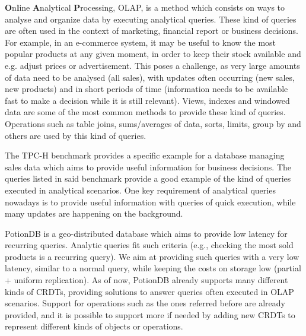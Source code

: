 \textbf{O}n\textbf{l}ine \textbf{A}nalytical \textbf{P}rocessing, OLAP, is a method which consists on ways to analyse and organize data by executing analytical queries.
These kind of queries are often used in the context of marketing, financial report or business decisions.
For example, in an e-commerce system, it may be useful to know the most popular products at any given moment, in order to keep their stock available and e.g. adjust prices or advertisement.
This poses a challenge, as very large amounts of data need to be analysed (all sales), with updates often occurring (new sales, new products) and in short periods of time (information needs to be available fast to make a decision while it is still relevant).
Views, indexes and windowed data are some of the most common methods to provide these kind of queries.
Operations such as table joins, sums/averages of data, sorts, limits, group by and others are used by this kind of queries.

The TPC-H benchmark provides a specific example for a database managing sales data which aims to provide useful information for business decisions.
The queries listed in said benchmark provide a good example of the kind of queries executed in analytical scenarios.
One key requirement of analytical queries nowadays is to provide useful information with queries of quick execution, while many updates are happening on the background.

PotionDB is a geo-distributed database which aims to provide low latency for recurring queries.
Analytic queries fit such criteria (e.g., checking the most sold products is a recurring query).
We aim at providing such queries with a very low latency, similar to a normal query, while keeping the costs on storage low (partial + uniform replication).
As of now, PotionDB already supports many different kinds of CRDTs, providing solutions to answer queries often executed in OLAP scenarios.
Support for operations such as the ones referred before are already provided, and it is possible to support more if needed by adding new CRDTs to represent different kinds of objects or operations.
 



